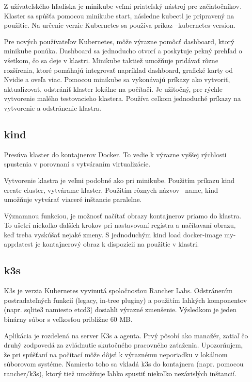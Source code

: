 Z užívateľského hľadiska je minikube veľmi priateľský nástroj pre začiatočníkov. Klaster sa spúšťa pomocou minikube start, následne kubectl je pripravený na použitie. Na určenie verzie Kubernetes sa používa príkaz --kubernetes-version.

Pre nových používateľov Kubernetes, môže výrazne pomôcť dashboard, ktorý minikube ponúka. Dashboard sa jednoducho otvorí a poskytuje pekný prehľad o všetkom, čo sa deje v klastri. Minikube taktiež umožňuje pridávať rôzne rozšírenia, ktoré pomáhajú integrovať napríklad dashboard, grafické karty od Nvidie a oveľa viac. Pomocou minikube sa vykonávajú príkazy ako vytvoriť, aktualizovať, odstrániť klaster lokálne na počítači. Je užitočný, pre rýchle vytvorenie malého testovacieho klastera. Používa celkom jednoduché príkazy na vytvorenie a odstránenie klastra.

\subsection*{kind}

Presúva klaster do kontajnerov Docker. To vedie k výrazne vyššej rýchlosti spustenia v porovnaní s vytváraním virtualizácie.

Vytvorenie klastra je veľmi podobné ako pri minikube. Použitím príkazu kind create cluster, vytvárame klaster. Použitím rôznych názvov  --name, kind umožňuje vytvárať viaceré inštancie paralelne.

Významnou funkciou, je možnosť načítať obrazy kontajnerov priamo do klastra. To ušetrí niekoľko ďalších krokov pri nastavovaní registra a načítavaní obrazu, keď treba vyskúšať nejaké zmeny. S jednoduchým kind load docker-image my-app:latest je kontajnerový obraz k dispozícii na použitie v klastri.

\subsection*{k3s}

K3s je verzia Kubernetes vyvinutá spoločnosťou Rancher Labs. Odstránením postradateľných funkcií (legacy, in-tree pluginy) a použitím ľahkých komponentov (napr. sqlite3 namiesto etcd3) dosiahli výrazné zmenšenie. Výsledkom je jeden binárny súbor s veľkosťou približne 60 MB.

Aplikácia je rozdelená na server K3s a agenta. Prvý pôsobí ako manažér, zatiaľ čo druhý zodpovedá za zvládnutie skutočného pracovného zaťaženia. Upozorňujem, že pri spúšťaní na počítací môže dôjsť k výraznému neporiadku v lokálnom súborovom systéme. Namiesto toho sa vkladá k3s do kontajnera (napr. pomocou rancher/k3s), ktorý tiež umožňuje ľahko spustiť niekoľko nezávislých inštancií.

